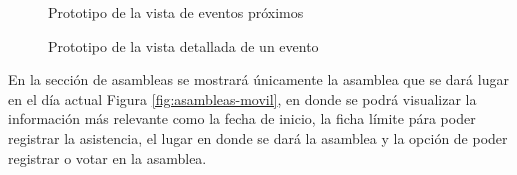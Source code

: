 \begin{figure}[H]
    \centering
    \caption{Prototipo de la vista de eventos próximos}
    \label{fig:login-eventos}
\end{figure}


\begin{figure}[H]
    \centering
    \caption{Prototipo de la vista detallada de un evento}
    \label{fig:login-eventos-detalle}
\end{figure}

En la sección de asambleas se mostrará únicamente la asamblea que se dará lugar en el día actual Figura \ref{fig:asambleas-movil}, en donde se podrá visualizar la información más relevante como la fecha de inicio, la ficha límite pára poder registrar la asistencia, el lugar en donde se dará la asamblea y la opción de poder registrar o votar en la asamblea.


